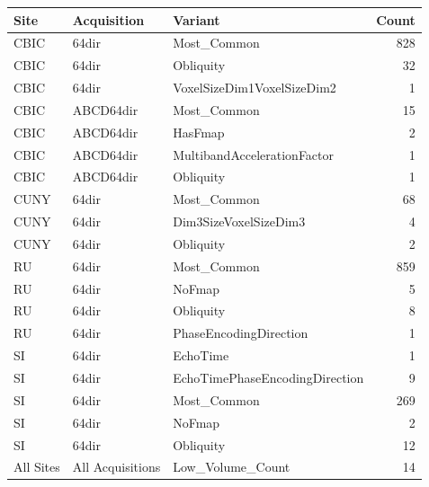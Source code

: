 \documentclass[9pt,lineno]{elife}
\begin{document}
\begin{appendixbox}
\begin{tabular}{lllr}
\toprule
     Site &      Acquisition &                        Variant &  Count \\
\midrule
     CBIC &            64dir &                    Most\_Common &    828 \\
     CBIC &            64dir &                      Obliquity &     32 \\
     CBIC &            64dir &     VoxelSizeDim1VoxelSizeDim2 &      1 \\
     CBIC &        ABCD64dir &                    Most\_Common &     15 \\
     CBIC &        ABCD64dir &                        HasFmap &      2 \\
     CBIC &        ABCD64dir &    MultibandAccelerationFactor &      1 \\
     CBIC &        ABCD64dir &                      Obliquity &      1 \\
     CUNY &            64dir &                    Most\_Common &     68 \\
     CUNY &            64dir &          Dim3SizeVoxelSizeDim3 &      4 \\
     CUNY &            64dir &                      Obliquity &      2 \\
       RU &            64dir &                    Most\_Common &    859 \\
       RU &            64dir &                         NoFmap &      5 \\
       RU &            64dir &                      Obliquity &      8 \\
       RU &            64dir &         PhaseEncodingDirection &      1 \\
       SI &            64dir &                       EchoTime &      1 \\
       SI &            64dir & EchoTimePhaseEncodingDirection &      9 \\
       SI &            64dir &                    Most\_Common &    269 \\
       SI &            64dir &                         NoFmap &      2 \\
       SI &            64dir &                      Obliquity &     12 \\
All Sites & All Acquisitions &               Low\_Volume\_Count &     14 \\
\bottomrule
\end{tabular}

\end{appendixbox}
\end{document}
